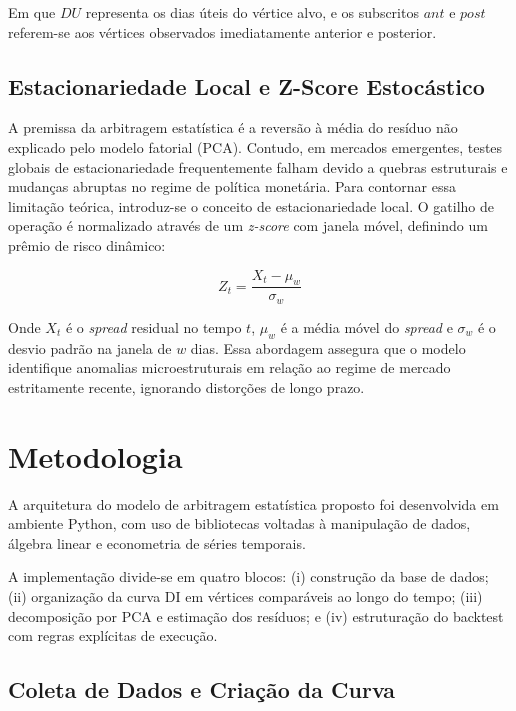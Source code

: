 \documentclass[fleqn]{rbfin}
\begin{document}
Em que $DU$ representa os dias úteis do vértice alvo, e os subscritos $ant$ e $post$ referem-se aos vértices observados imediatamente anterior e posterior.

\subsection{Estacionariedade Local e Z-Score Estocástico}

A premissa da arbitragem estatística é a reversão à média do resíduo não explicado pelo modelo fatorial (PCA). Contudo, em mercados emergentes, testes globais de estacionariedade frequentemente falham devido a quebras estruturais e mudanças abruptas no regime de política monetária. Para contornar essa limitação teórica, introduz-se o conceito de estacionariedade local. O gatilho de operação é normalizado através de um \textit{z-score} com janela móvel, definindo um prêmio de risco dinâmico:



$$Z_t = \frac{X_t - \mu_w}{\sigma_w}$$



Onde $X_t$ é o \textit{spread} residual no tempo $t$, $\mu_w$ é a média móvel do \textit{spread} e $\sigma_w$ é o desvio padrão na janela de $w$ dias. Essa abordagem assegura que o modelo identifique anomalias microestruturais em relação ao regime de mercado estritamente recente, ignorando distorções de longo prazo.

\section{Metodologia}

A arquitetura do modelo de arbitragem estatística proposto foi desenvolvida em ambiente Python, com uso de bibliotecas voltadas à manipulação de dados, álgebra linear e econometria de séries temporais.


A implementação divide-se em quatro blocos: (i) construção da base de dados; (ii) organização da curva DI em vértices comparáveis ao longo do tempo; (iii) decomposição por PCA e estimação dos resíduos; e (iv) estruturação do backtest com regras explícitas de execução.

\subsection{Coleta de Dados e Criação da Curva}
\end{document}
